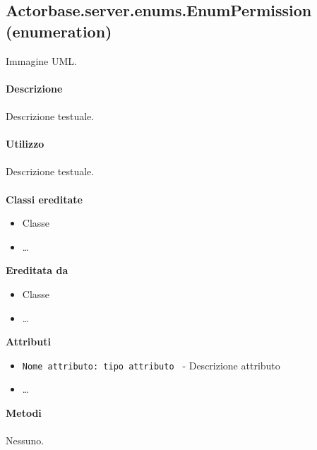 \documentclass[a4paper]{article}
\begin{document}
	\subsection{Actorbase.server.enums.EnumPermission (enumeration)}
		Immagine UML.
		\\ \\
		\textbf{Descrizione}
			\\ \\
			Descrizione testuale.
			\\ \\
		\textbf{Utilizzo}
			\\ \\
			Descrizione testuale.
			\\ \\
		\textbf{Classi ereditate}
			\begin{itemize}
				\item Classe
				\item \dots
			\end{itemize}
		\textbf{Ereditata da}
			\begin{itemize}
				\item Classe
				\item \dots
			\end{itemize}
		\textbf{Attributi}
			\begin{itemize}
				\item \texttt{Nome attributo: tipo attributo } - Descrizione attributo
				\item \dots
			\end{itemize}
		\textbf{Metodi}
			\\ \\
			Nessuno.
			
\end{document}
